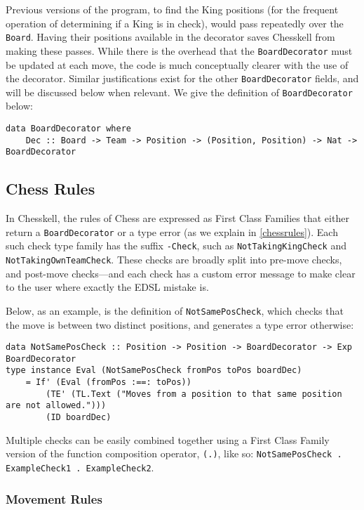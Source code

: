 \documentclass[12pt, a4paper, bibliography=totocnumbered]{scrreprt}
\newcommand{\inline}[1]{\lstinline[basicstyle=\ttfamily\footnotesize]{#1}}
\begin{document}
Previous versions of the program, to find the King positions (for the frequent operation of determining if a King is in check), would pass repeatedly over the \inline{Board}. Having their positions available in the decorator saves Chesskell from making these passes. While there is the overhead that the \inline{BoardDecorator} must be updated at each move, the code is much conceptually clearer with the use of the decorator. Similar justifications exist for the other \inline{BoardDecorator} fields, and will be discussed below when relevant. We give the definition of \inline{BoardDecorator} below:

\begin{lstlisting}
data BoardDecorator where
    Dec :: Board -> Team -> Position -> (Position, Position) -> Nat -> BoardDecorator
\end{lstlisting}

\subsection{Chess Rules}

In Chesskell, the rules of Chess are expressed as First Class Families that either return a \inline{BoardDecorator} or a type error (as we explain in \cref{chessrules}). Each such check type family has the suffix \inline{-Check}, such as \inline{NotTakingKingCheck} and \inline{NotTakingOwnTeamCheck}. These checks are broadly split into pre-move checks, and post-move checks---and each check has a custom error message to make clear to the user where exactly the EDSL mistake is.

Below, as an example, is the definition of \inline{NotSamePosCheck}, which checks that the move is between two distinct positions, and generates a type error otherwise:

\begin{lstlisting}
data NotSamePosCheck :: Position -> Position -> BoardDecorator -> Exp BoardDecorator
type instance Eval (NotSamePosCheck fromPos toPos boardDec)
    = If' (Eval (fromPos :==: toPos))
        (TE' (TL.Text ("Moves from a position to that same position are not allowed.")))
        (ID boardDec)
\end{lstlisting}

Multiple checks can be easily combined together using a First Class Family version of the function composition operator, \inline{(.)}, like so: \inline{NotSamePosCheck . ExampleCheck1 . ExampleCheck2}.

\subsubsection{Movement Rules}
\end{document}
